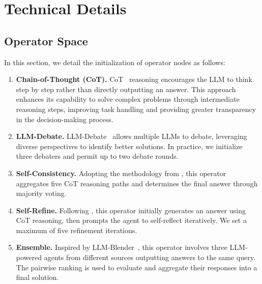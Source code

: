 \documentclass{article}
\theoremstyle{plain}
\theoremstyle{definition}
\theoremstyle{remark}
\begin{document}
\section{Technical Details}
\subsection{Operator Space}\label{app:operator}

In this section, we detail the initialization of operator nodes as follows:

\begin{enumerate}
    \item \textbf{Chain-of-Thought (CoT).}  
    CoT~\citep{cot} reasoning encourages the LLM to think step by step rather than directly outputting an answer. This approach enhances its capability to solve complex problems through intermediate reasoning steps, improving task handling and providing greater transparency in the decision-making process.

    \item \textbf{LLM-Debate.}  
    LLM-Debate~\citep{arXiv2023_MultiAgent-Debate} allows multiple LLMs to debate, leveraging diverse perspectives to identify better solutions. In practice, we initialize three debaters and permit up to two debate rounds.


    \item \textbf{Self-Consistency.}  
    Adopting the methodology from \citet{wang2023selfconsistency}, this operator aggregates five CoT reasoning paths and determines the final answer through majority voting.

    \item \textbf{Self-Refine.}  
    Following \citet{NeurIPS2023_Self-Refine}, this operator initially generates an answer using CoT reasoning, then prompts the agent to self-reflect iteratively. We set a maximum of five refinement iterations.

    \item \textbf{Ensemble.}  
    Inspired by LLM-Blender~\citep{blender}, this operator involves three LLM-powered agents from different sources outputting answers to the same query. The pairwise ranking is used to evaluate and aggregate their responses into a final solution.


\end{enumerate}
\end{document}
